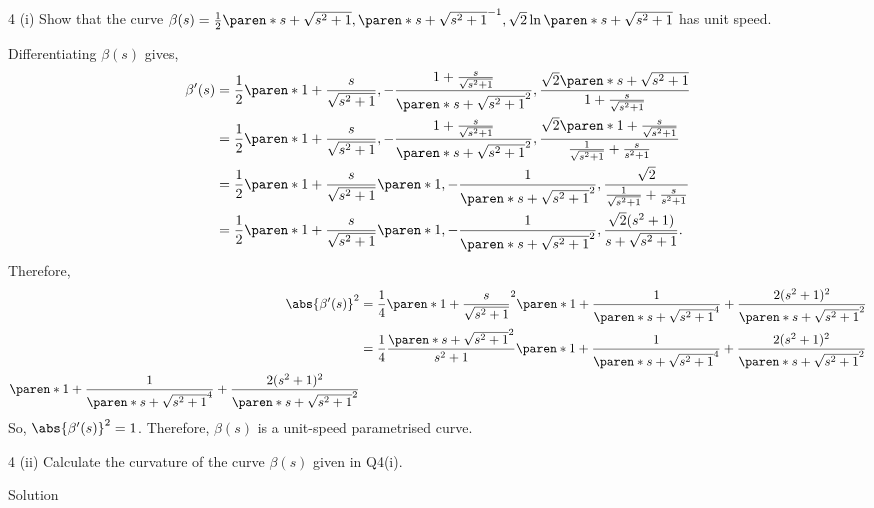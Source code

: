 \documentclass[11pt]{penrose}
\begin{document}
\begin{problem}{4 (i)}
    Show that the curve $\beta(s) = \frac{1}{2}\paren*{s + \sqrt{s^2 + 1}, \paren*{s + \sqrt{s^2 + 1}}^{-1}, \sqrt{2}\ln\paren*{s + \sqrt{s^2 + 1}}}$ has unit speed.

    \solution Differentiating $\beta(s)$ gives,
    \begin{align*}
        \beta'(s)
        &= \frac{1}{2} \paren*{1 + \frac{s}{\sqrt{s^2 + 1}}, -\frac{1 + \frac{s}{\sqrt{s^2 + 1}}}{\paren*{s + \sqrt{s^2 + 1}}^2}, \frac{\sqrt{2} \paren*{s + \sqrt{s^2 + 1}}}{1 + \frac{s}{\sqrt{s^2 + 1}}}}\\
        &= \frac{1}{2} \paren*{1 + \frac{s}{\sqrt{s^2 + 1}}, -\frac{1 + \frac{s}{\sqrt{s^2 + 1}}}{\paren*{s + \sqrt{s^2 + 1}}^2},
        \frac{ \sqrt{2} \paren*{1 + \frac{s}{\sqrt{s^2 + 1}}} }{ \frac{1}{\sqrt{s^2 + 1}} + \frac{s}{s^2 + 1} }}\\
        &= \frac{1}{2} \paren*{1 + \frac{s}{\sqrt{s^2 + 1}}} \paren*{1, -\frac{1}{\paren*{s + \sqrt{s^2 + 1}}^2}, \frac{ \sqrt{2} }{ \frac{1}{\sqrt{s^2 + 1}} + \frac{s}{s^2 + 1}} }\\
        &= \frac{1}{2} \paren*{1 + \frac{s}{\sqrt{s^2 + 1}}} \paren*{1, -\frac{1}{\paren*{s + \sqrt{s^2 + 1}}^2}, \frac{ \sqrt{2} (s^2 + 1) }{ s + \sqrt{s^2 + 1}} }.
    \end{align*}
    Therefore,
    \begin{align*}
        \abs{\beta'(s)}^2
        &= \frac{1}{4} \paren*{1 + \frac{s}{\sqrt{s^2 + 1}}}^2
        \paren*{1 + \frac{1}{\paren*{s + \sqrt{s^2 + 1}}^4} + \frac{ 2 (s^2 + 1)^2 }{\paren*{s + \sqrt{s^2 + 1}}^2}}\\
        &= \frac{1}{4} \frac{\paren*{s + \sqrt{s^2 + 1}}^2}{s^2 + 1}
        \paren*{1 + \frac{1}{\paren*{s + \sqrt{s^2 + 1}}^4} + \frac{ 2 (s^2 + 1)^2 }{\paren*{s + \sqrt{s^2 + 1}}^2}}\\
        \paren*{1 + \frac{1}{\paren*{s + \sqrt{s^2 + 1}}^4} + \frac{ 2 (s^2 + 1)^2 }{\paren*{s + \sqrt{s^2 + 1}}^2}}\\
    \end{align*}
    So, $\abs{\beta'(s)}^2 = 1$. Therefore, $\beta(s)$ is a unit-speed parametrised curve.
\end{problem}

\begin{problem}{4 (ii)}
    Calculate the curvature of the curve $\beta(s)$ given in Q4(i).

    \solution Solution
\end{problem}
\end{document}
